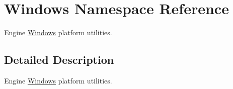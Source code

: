 \hypertarget{namespaceWindows}{}\section{Windows Namespace Reference}
\label{namespaceWindows}


Engine \hyperlink{namespaceWindows}{Windows} platform utilities.  




\subsection{Detailed Description}
Engine \hyperlink{namespaceWindows}{Windows} platform utilities. 